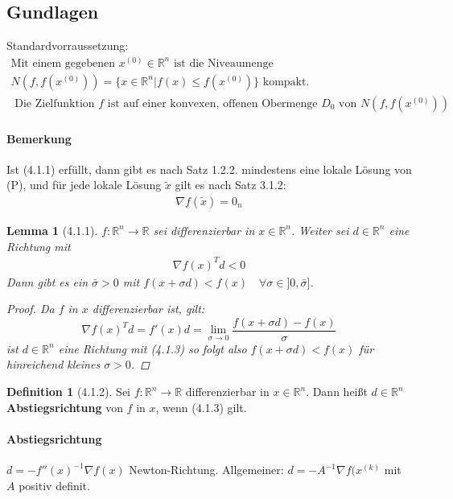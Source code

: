 \documentclass[ngerman,halfparskip]{scrartcl}
\newtheorem*{lemma}{Lemma}
\theoremstyle{definition}
\newtheorem*{defin}{Definition}
\def\R{\mathbb R}
\begin{document}
\subsection*{Gundlagen}
Standardvorraussetzung:
\begin{gather*}\tag{4.1.1}
\text{Mit einem gegebenen }x^{(0)}\in\R^n \text{ ist die Niveaumenge }\\ N(f,f(x^{(0)}))=\{x\in\R^n | f(x)\leq f(x^{(0)})\} \text{ kompakt.}\\\text{ Die Zielfunktion }f \text{ ist auf einer konvexen, offenen Obermenge }D_0 \text{ von }N(f,f(x^{(0)}))
\end{gather*}

\paragraph{Bemerkung} Ist (4.1.1) erfüllt, dann gibt  es nach Satz 1.2.2. mindestens eine lokale Lösung von (P), und für jede lokale Lösung $\tilde x$ gilt es nach Satz 3.1.2:
\begin{gather}
\tag{4.1.2} \nabla f (\tilde x)=0_n
\end{gather}



\begin{lemma}[4.1.1] $f:\R^n\rightarrow \R$ sei differenzierbar in $x\in\R^n$. Weiter sei $d\in\R^n$ eine Richtung mit 
\begin{gather}
\tag{4.1.3} \nabla f(x)^Td<0
\end{gather}
Dann gibt es ein $\bar \sigma >0$ mit $f(x+\sigma d)< f(x) \quad \forall \sigma \in ]0,\bar \sigma]$.
\begin{proof}
Da $f$ in $x$ differenzierbar ist, gilt: $$ \nabla f(x)^Td=f'(x)d=\lim\limits_{\sigma\to 0}\frac {f(x+\sigma d)-f(x)}{\sigma}$$ ist $d\in\R^n$ eine Richtung mit (4.1.3) so folgt also $f(x+\sigma d)<f(x)$ für hinreichend kleines $\sigma>0$.
\end{proof}
\end{lemma}

\begin{defin}
[4.1.2] Sei $f:\R^n\rightarrow \R$ differenzierbar in $x\in\R^n$. Dann heißt $d\in\R^n$ \textbf{Abstiegsrichtung} von $f$ in $x$, wenn (4.1.3) gilt.
\end{defin}

\paragraph*{Abstiegsrichtung} $d=-f''(x)^{-1}\nabla f(x)$ Newton-Richtung. Allgemeiner: $d=-A^{-1}\nabla f(x^{(k)}$ mit $A$ positiv definit. 
\end{document}
